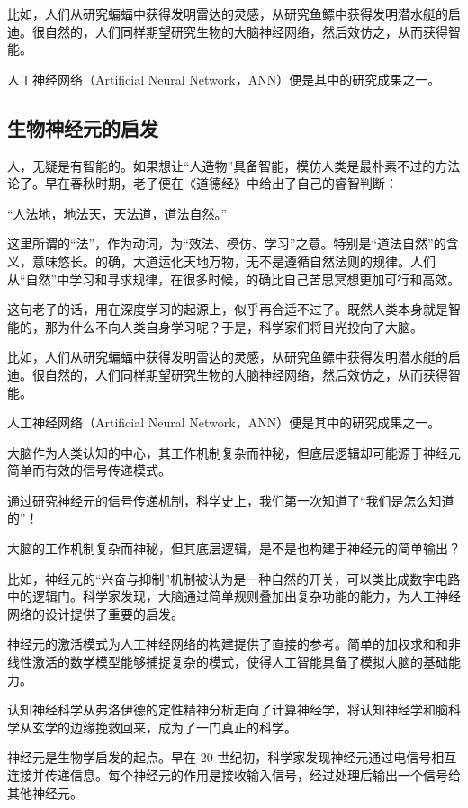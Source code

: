 比如，人们从研究蝙蝠中获得发明雷达的灵感，从研究鱼鳔中获得发明潜水艇的启迪。很自然的，人们同样期望研究生物的大脑神经网络，然后效仿之，从而获得智能。

人工神经网络（Artificial Neural Network，ANN）便是其中的研究成果之一。


\subsection{生物神经元的启发}

人，无疑是有智能的。如果想让“人造物”具备智能，模仿人类是最朴素不过的方法论了。早在春秋时期，老子便在《道德经》中给出了自己的睿智判断：

“人法地，地法天，天法道，道法自然。”

这里所谓的“法”，作为动词，为“效法、模仿、学习”之意。特别是“道法自然”的含义，意味悠长。的确，大道运化天地万物，无不是遵循自然法则的规律。人们从“自然”中学习和寻求规律，在很多时候，的确比自己苦思冥想更加可行和高效。

这句老子的话，用在深度学习的起源上，似乎再合适不过了。既然人类本身就是智能的，那为什么不向人类自身学习呢？于是，科学家们将目光投向了大脑。

比如，人们从研究蝙蝠中获得发明雷达的灵感，从研究鱼鳔中获得发明潜水艇的启迪。很自然的，人们同样期望研究生物的大脑神经网络，然后效仿之，从而获得智能。

人工神经网络（Artificial Neural Network，ANN）便是其中的研究成果之一。

大脑作为人类认知的中心，其工作机制复杂而神秘，但底层逻辑却可能源于神经元简单而有效的信号传递模式。

通过研究神经元的信号传递机制，科学史上，我们第一次知道了“我们是怎么知道的”！

大脑的工作机制复杂而神秘，但其底层逻辑，是不是也构建于神经元的简单输出？

比如，神经元的“兴奋与抑制”机制被认为是一种自然的开关，可以类比成数字电路中的逻辑门。科学家发现，大脑通过简单规则叠加出复杂功能的能力，为人工神经网络的设计提供了重要的启发。

神经元的激活模式为人工神经网络的构建提供了直接的参考。简单的加权求和和非线性激活的数学模型能够捕捉复杂的模式，使得人工智能具备了模拟大脑的基础能力。

认知神经科学从弗洛伊德的定性精神分析走向了计算神经学，将认知神经学和脑科学从玄学的边缘挽救回来，成为了一门真正的科学。

神经元是生物学启发的起点。早在 20 世纪初，科学家发现神经元通过电信号相互连接并传递信息。每个神经元的作用是接收输入信号，经过处理后输出一个信号给其他神经元。


